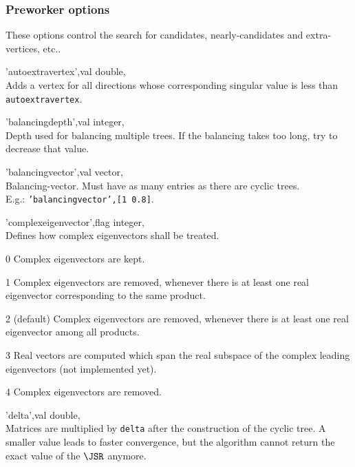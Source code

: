 \subsubsection{Preworker options} These options control the search for candidates, nearly-candidates and extra-vertices, etc..
\begin{param}

\item['autoextravertex',val] double, \\Adds a vertex for all directions whose corresponding singular value is less than \texttt{autoextravertex}. 


\item['balancingdepth',val] integer, \\Depth used for balancing multiple trees. If the balancing takes too long, try to decrease that value.

\item['balancingvector',val] vector, \\Balancing-vector. Must have as many entries as there are cyclic trees.\\
E.g.: \texttt{'balancingvector',[1 0.8]}.

\item['complexeigenvector',flag] integer, \\Defines how complex eigenvectors shall be treated.
\begin{param}
\item[0] Complex eigenvectors are kept.
\item[1] Complex eigenvectors are removed, whenever there is at least one real eigenvector corresponding to the same product.
\item[2] (default) Complex eigenvectors are removed, whenever there is at least one real eigenvector among all products.
\item[3] Real vectors are computed which span the real subspace of the complex leading eigenvectors (not implemented yet).
\item[4] Complex eigenvectors are removed.
\end{param}

\item['delta',val] double, \\Matrices are multiplied by \texttt{delta} after the construction of the cyclic tree. 
A smaller value leads to faster convergence, but the algorithm cannot return the exact value of the $\JSR$ anymore.


\end{param}
